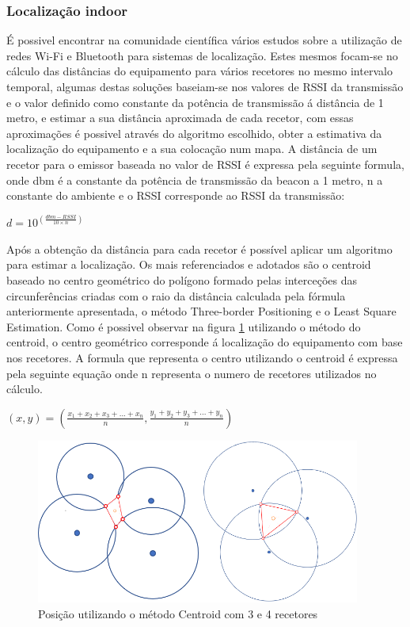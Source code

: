 \subsubsection{Localização indoor}
\par
É possivel encontrar na comunidade científica vários estudos sobre a utilização de redes Wi-Fi e Bluetooth para sistemas de localização. Estes mesmos focam-se no cálculo das distâncias do equipamento para vários recetores no mesmo intervalo temporal, algumas destas soluções baseiam-se nos valores de RSSI da transmissão e o valor definido como constante da potência de transmissão á distância de 1 metro, e estimar a sua distância aproximada de cada recetor, com essas aproximações é possivel através do algoritmo escolhido\cite{Wang2013}, obter a estimativa da localização do equipamento e a sua colocação num mapa.
A distância de um recetor para o emissor baseada no  valor de RSSI é expressa pela seguinte formula, onde dbm é a constante da potência de transmissão da beacon a 1 metro, n a constante do ambiente e o RSSI corresponde ao RSSI da transmissão:
\par
\begin{center}
  $d=10^(\frac{dbm-RSSI}{10 \times n})$
\end{center}

\par
Após a obtenção da distância para cada recetor é possível  aplicar um algoritmo para estimar a localização. Os mais referenciados e adotados são o centroid baseado no centro geométrico do polígono formado pelas interceções das circunferências criadas com o raio da distância calculada pela fórmula anteriormente apresentada, o método Three-border Positioning e o Least Square Estimation.
Como é possivel observar na figura \ref{centroid} utilizando o método do centroid, o centro geométrico corresponde á localização do equipamento com base nos recetores. A formula que representa o centro utilizando o centroid é expressa pela seguinte equação onde n representa o numero de recetores utilizados no cálculo.
\par
\begin{center}
$ (x,y)= (\frac{x_{1}+x_{2}+x_{3}+...+x_{n}}{n},\frac{y_{1}+y_{2}+y_{3}+...+y_{n}}{n})$
\end{center}

\begin{figure}[htb]
\centering
\includegraphics[width=0.95\textwidth]{images/centroid3.png}
\caption{Posição utilizando o método Centroid com 3 e 4 recetores}\label{centroid}
\end{figure}

